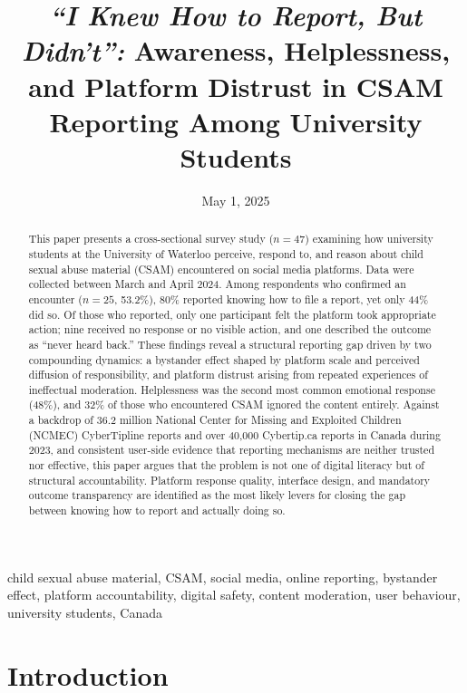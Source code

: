 \documentclass{ieee-portfolio}
\title{\textit{``I Knew How to Report, But Didn't'':} Awareness, Helplessness, and Platform Distrust in CSAM Reporting Among University Students}
\date{May 1, 2025}
\author{
    \IEEEauthorblockN{Jaxen Anirban Dutta\,\orcidlink{0009-0002-5088-4679}}
    \IEEEauthorblockA{\textit{David R. Cheriton School of Computer Science} \\
    \textit{University of Waterloo, Waterloo, Ontario, Canada} \\
    jaxen.dutta@uwaterloo.ca}
}
\begin{document}
 
\maketitle
 
\begin{abstract}
This paper presents a cross-sectional survey study ($n = 47$) examining how university students at the University of Waterloo perceive, respond to, and reason about child sexual abuse material (CSAM) encountered on social media platforms. Data were collected between March and April 2024. Among respondents who confirmed an encounter ($n = 25$, 53.2\%), 80\% reported knowing how to file a report, yet only 44\% did so. Of those who reported, only one participant felt the platform took appropriate action; nine received no response or no visible action, and one described the outcome as ``never heard back.'' These findings reveal a structural reporting gap driven by two compounding dynamics: a bystander effect shaped by platform scale and perceived diffusion of responsibility, and platform distrust arising from repeated experiences of ineffectual moderation. Helplessness was the second most common emotional response (48\%), and 32\% of those who encountered CSAM ignored the content entirely. Against a backdrop of 36.2 million National Center for Missing and Exploited Children (NCMEC) CyberTipline reports and over 40,000 Cybertip.ca reports in Canada during 2023, and consistent user-side evidence that reporting mechanisms are neither trusted nor effective, this paper argues that the problem is not one of digital literacy but of structural accountability. Platform response quality, interface design, and mandatory outcome transparency are identified as the most likely levers for closing the gap between knowing how to report and actually doing so.
\end{abstract}
 
\begin{IEEEkeywords}
child sexual abuse material, CSAM, social media, online reporting, bystander effect, platform accountability, digital safety, content moderation, user behaviour, university students, Canada
\end{IEEEkeywords}
 
\section{Introduction}
 
\end{document}
